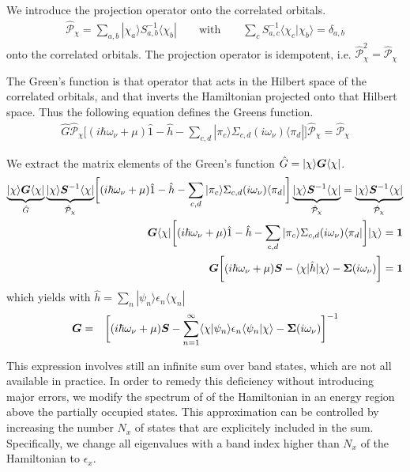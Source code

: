 \documentclass[11pt,a4paper]{report}
\begin{document}
We introduce the projection operator onto the correlated orbitals.
\begin{eqnarray}
\hat{\mathcal{P}}_\chi=\sum_{a,b}|\chi_a\rangle S^{-1}_{a,b}\langle\chi_b|
\qquad\text{with}\qquad \sum_c S^{-1}_{a,c}\langle\chi_c|\chi_b\rangle=\delta_{a,b}
\end{eqnarray}
onto the correlated orbitals. The projection operator is idempotent,
i.e. $\hat{\mathcal{P}}_\chi^2=\hat{\mathcal{P}}_\chi$

The Green's function is that operator that acts in the Hilbert space
of the correlated orbitals, and that inverts the Hamiltonian projected
onto that Hilbert space. Thus the following equation defines the
Greens function.
\begin{eqnarray}
\hat{G}\hat{\mathcal{P}}_\chi
\biggl[(i\hbar\omega_\nu+\mu)\hat{1}-\hat{h}-\sum_{c,d}|\pi_c\rangle\Sigma_{c,d}(i\omega_\nu)\langle\pi_d|\biggr]
\hat{\mathcal{P}}_\chi=\hat{\mathcal{P}}_\chi
\end{eqnarray}

We extract the matrix elements of the Green's function
$\hat{G}=|\chi\rangle\bm{G}\langle\chi|$.
\begin{eqnarray}
\underbrace{|\chi\rangle \bm{G}\langle\chi|}_{\hat{G}}
\underbrace{|\chi\rangle \bm{S}^{-1}\langle\chi|}_{\hat{\mathcal{P}}_\chi}
\biggl[(i\hbar\omega_\nu+\mu)\hat{1}-\hat{h}-\sum_{c,d}|\pi_c\rangle\Sigma_{c,d}(i\omega_\nu)\langle\pi_d|\biggr]
\underbrace{|\chi\rangle \bm{S}^{-1}\langle\chi|}_{\hat{\mathcal{P}}_\chi}
=\underbrace{|\chi\rangle \bm{S}^{-1}\langle\chi|}_{\hat{\mathcal{P}}_\chi}
\nonumber\\
\bm{G}\langle\chi|
\biggl[(i\hbar\omega_\nu+\mu)\hat{1}-\hat{h}-\sum_{c,d}|\pi_c\rangle\Sigma_{c,d}(i\omega_\nu)\langle\pi_d|\biggr]
|\chi\rangle =\bm{1}
\nonumber\\
\bm{G}
\biggl[(i\hbar\omega_\nu+\mu)\bm{S}-\langle\chi|\hat{h}|\chi\rangle-\bm{\Sigma}(i\omega_\nu)\biggr]
=\bm{1}
\nonumber\\
\end{eqnarray}
which yields with $\hat{h}=\sum_n|\psi_n\rangle\epsilon_n\langle\chi_n|$
\begin{eqnarray}
\bm{G}&=&
\biggl[(i\hbar\omega_\nu+\mu)\bm{S}
-\sum_{n=1}^\infty
\langle\chi|\psi_n\rangle \epsilon_n\langle\psi_n|\chi\rangle-\bm{\Sigma}(i\omega_\nu)\biggr]^{-1}
\end{eqnarray}

This expression involves still an infinite sum over band states, which
are not all available in practice. In order to remedy this deficiency
without introducing major errors, we modify the spectrum of of the
Hamiltonian in an energy region above the partially occupied states.
This approximation can be controlled by increasing the number $N_x$ of
states that are explicitely included in the sum. Specifically, we
change all eigenvalues with a band index higher than $N_x$ of the
Hamiltonian to $\epsilon_x$.
\end{document}
